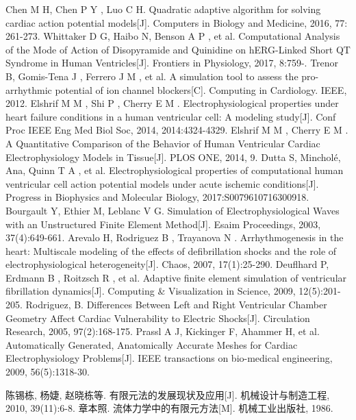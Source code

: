 \documentclass[twoside,UTF8]{nputhesis}
\begin{document}
\begin{thebibliography}{99}
	Chen M H, Chen P Y , Luo C H. Quadratic adaptive algorithm for solving cardiac action potential models[J]. Computers in Biology and Medicine, 2016, 77: 261-273.
	Whittaker D G, Haibo N, Benson A P , et al. Computational Analysis of the Mode of Action of Disopyramide and Quinidine on hERG-Linked Short QT Syndrome in Human Ventricles[J]. Frontiers in Physiology, 2017, 8:759-.
	Trenor B, Gomis-Tena J , Ferrero J M , et al. A simulation tool to assess the pro-arrhythmic potential of ion channel blockers[C]. Computing in Cardiology. IEEE, 2012.
	Elshrif M M , Shi P , Cherry E M . Electrophysiological properties under heart failure conditions in a human ventricular cell: A modeling study[J]. Conf Proc IEEE Eng Med Biol Soc, 2014, 2014:4324-4329.
	Elshrif M M , Cherry E M . A Quantitative Comparison of the Behavior of Human Ventricular Cardiac Electrophysiology Models in Tissue[J]. PLOS ONE, 2014, 9.
	Dutta S, Mincholé, Ana, Quinn T A , et al. Electrophysiological properties of computational human ventricular cell action potential models under acute ischemic conditions[J]. Progress in Biophysics and Molecular Biology, 2017:S0079610716300918.
	Bourgault Y, Ethier M, Leblanc V G. Simulation of Electrophysiological Waves with an Unstructured Finite Element Method[J]. Esaim Proceedings, 2003, 37(4):649-661.
	Arevalo H, Rodriguez B , Trayanova N . Arrhythmogenesis in the heart: Multiscale modeling of the effects of defibrillation shocks and the role of electrophysiological heterogeneity[J]. Chaos, 2007, 17(1):25-290.
	Deuflhard P, Erdmann B , Roitzsch R , et al. Adaptive finite element simulation of ventricular fibrillation dynamics[J]. Computing \& Visualization in Science, 2009, 12(5):201-205.
	Rodriguez, B. Differences Between Left and Right Ventricular Chamber Geometry Affect Cardiac Vulnerability to Electric Shocks[J]. Circulation Research, 2005, 97(2):168-175.
	Prassl A J, Kickinger F, Ahammer H, et al. Automatically Generated, Anatomically Accurate Meshes for Cardiac Electrophysiology Problems[J]. IEEE transactions on bio-medical engineering, 2009, 56(5):1318-30.
	
	
	陈锡栋, 杨婕, 赵晓栋等. 有限元法的发展现状及应用[J]. 机械设计与制造工程, 2010, 39(11):6-8.
	章本照. 流体力学中的有限元方法[M]. 机械工业出版社, 1986.
	

\end{thebibliography}
\end{document}
